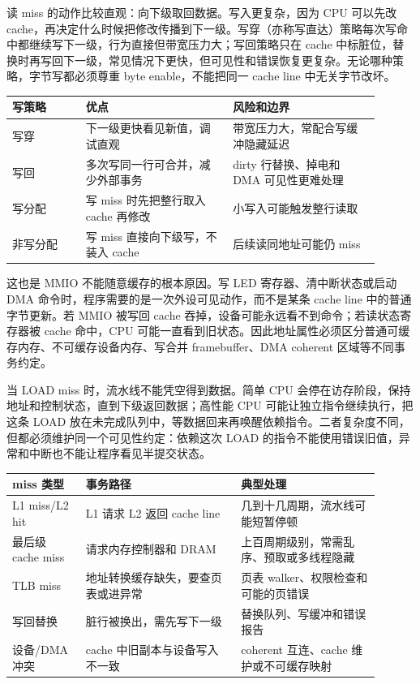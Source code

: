 读 miss 的动作比较直观：向下级取回数据。写入更复杂，因为 CPU 可以先改 cache，再决定什么时候把修改传播到下一级。写穿（亦称写直达）策略每次写命中都继续写下一级，行为直接但带宽压力大；写回策略只在 cache 中标脏位，替换时再写回下一级，常见情况下更快，但可见性和错误恢复更复杂。无论哪种策略，字节写都必须尊重 byte enable，不能把同一 cache line 中无关字节改坏。

\begin{longtable}{L{0.18\linewidth}L{0.36\linewidth}L{0.36\linewidth}}
\toprule
写策略 & 优点 & 风险和边界 \\
\midrule
写穿 & 下一级更快看见新值，调试直观 & 带宽压力大，常配合写缓冲隐藏延迟 \\
写回 & 多次写同一行可合并，减少外部事务 & dirty 行替换、掉电和 DMA 可见性更难处理 \\
写分配 & 写 miss 时先把整行取入 cache 再修改 & 小写入可能触发整行读取 \\
非写分配 & 写 miss 直接向下级写，不装入 cache & 后续读同地址可能仍 miss \\
\bottomrule
\end{longtable}

这也是 MMIO 不能随意缓存的根本原因。写 LED 寄存器、清中断状态或启动 DMA 命令时，程序需要的是一次外设可见动作，而不是某条 cache line 中的普通字节更新。若 MMIO 被写回 cache 吞掉，设备可能永远看不到命令；若读状态寄存器被 cache 命中，CPU 可能一直看到旧状态。因此地址属性必须区分普通可缓存内存、不可缓存设备内存、写合并 framebuffer、DMA coherent 区域等不同事务约定。

当 LOAD miss 时，流水线不能凭空得到数据。简单 CPU 会停在访存阶段，保持地址和控制状态，直到下级返回数据；高性能 CPU 可能让独立指令继续执行，把这条 LOAD 放在未完成队列中，等数据回来再唤醒依赖指令。二者复杂度不同，但都必须维护同一个可见性约定：依赖这次 LOAD 的指令不能使用错误旧值，异常和中断也不能让程序看见半提交状态。

\begin{longtable}{L{0.18\linewidth}L{0.38\linewidth}L{0.34\linewidth}}
\toprule
miss 类型 & 事务路径 & 典型处理 \\
\midrule
L1 miss/L2 hit & L1 请求 L2 返回 cache line & 几到十几周期，流水线可能短暂停顿 \\
最后级 cache miss & 请求内存控制器和 DRAM & 上百周期级别，常需乱序、预取或多线程隐藏 \\
TLB miss & 地址转换缓存缺失，要查页表或进异常 & 页表 walker、权限检查和可能的页错误 \\
写回替换 & 脏行被换出，需先写下一级 & 替换队列、写缓冲和错误报告 \\
设备/DMA 冲突 & cache 中旧副本与设备写入不一致 & coherent 互连、cache 维护或不可缓存映射 \\
\bottomrule
\end{longtable}

